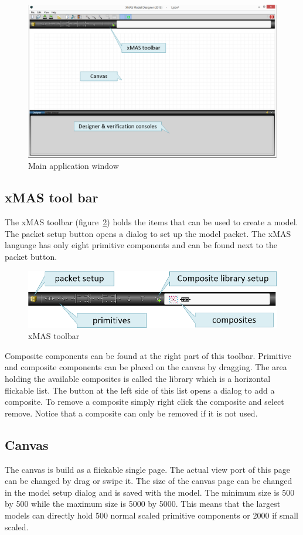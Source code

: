 \begin{figure}[here]
\begin{center}	
	\includegraphics[width=.70\linewidth]{pictures/xmd-empty}
	\caption{Main application window}
	\label{fig:mainwindow}
\end{center}
\end{figure}

\subsection{xMAS tool bar}
The xMAS toolbar (figure~\ref{fig:xmas-toolbar}) holds the items that can be
used to create a model. The packet setup button opens a dialog to set up the
model packet. The xMAS language has only eight primitive components and can be
found next to the packet button. 

\begin{figure}[here]
\begin{center}	
	\includegraphics[width=.70\linewidth]{pictures/xmas-toolbar}
	\caption{xMAS toolbar}
	\label{fig:xmas-toolbar}
\end{center}
\end{figure}

Composite components can be found at the right part of this toolbar. Primitive
and composite components can be placed on the canvas by dragging. The area
holding the available composites is called the library which is a horizontal
flickable list. The button at the left side of this list opens a dialog to add a
composite. To remove a composite simply right click the composite and select
remove. Notice that a composite can only be removed if it is not used.


\subsection{Canvas}
The canvas is build as a flickable single page. The actual view port of this page
can be changed by drag or swipe it. The size of the canvas page can be changed
in the model setup dialog and is saved with the model. The minimum size is 500
by 500 while the maximum size is 5000 by 5000. This means that the largest
models can directly hold 500 normal scaled primitive components or 2000 if small
scaled.

